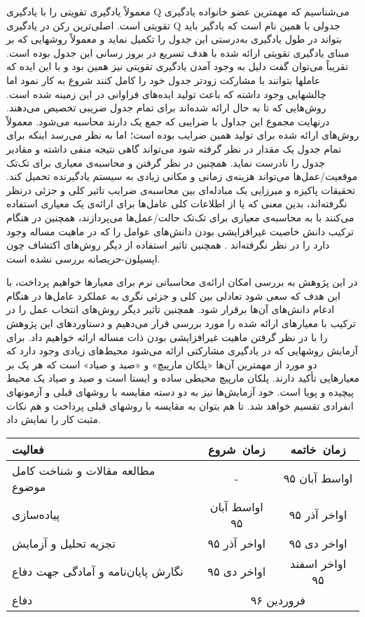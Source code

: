 \documentclass[12pt,a4paper]{article}
\newcommand{\renderref}[1] { \begingroup \let\clearpage\relax  \endgroup }
\begin{document}
معمولاً یادگیری تقویتی را با یادگیری Q می‌شناسیم که مهمترین عضو خانواده یادگیری تقویتی است. اصلی‌ترین رکن در
یادگیری Q جدولی با همین نام است که یادگیر باید بتواند در طول یادگیری به‌درستی این جدول را تکمیل نماید و معمولاً روشهایی
که بر مبنای یادگیری تقویتی ارائه شده با هدف تسریع در بروز رسانی این جدول بوده است. تقریباً می‌توان گفت دلیل به وجود
آمدن یادگیری تقویتی نیز همین بود و با این ایده که عاملها بتوانند با مشارکت زودتر جدول خود را کامل کنند شروع به کار نمود
اما چالشهایی وجود داشته که باعث تولید ایده‌های فراوانی در این زمینه شده است.
روش‌هایی که تا به حال ارائه‌ شده‌اند برای تمام جدول ضریبی تخصیص می‌دهند. درنهایت مجموع این جداول با ضرایبی که
جمع یک دارند محاسبه می‌شود. معمولاً روش‌های ارائه‌ شده برای تولید همین ضرایب بوده است؛ اما به نظر می‌رسد اینکه برای تمام جدول یک
مقدار در نظر گرفته شود می‌تواند گاهی نتیجه منفی داشته و مقادیر جدول را نادرست نماید. همچنین در نظر گرفتن و محاسبه‌ی معیاری برای تک‌تک موقعیت/عمل‌ها می‌تواند هزینه‌ی زمانی و مکانی زیادی به سیستم یادگیرنده تحمیل کند.
تحقیقات پاکیزه و میرزایی  یک مبادله‌ای بین محاسبه‌ی ضرایب تاثیر کلی و جزئی درنظر نگرفته‌اند، بدین معنی که یا از اطلاعات کلی عامل‌ها برای ارائه‌ی یک معیاری استفاده می‌کنند با به محاسبه‌ی معیاری برای تک‌تک حالت/عمل‌ها می‌پردازند، همچنین در هنگام ترکیب دانش خاصیت غیرافزایشی بودن دانش‌های عوامل را که در ماهیت مساله وجود دارد را در نظر نگرفته‌اند . همچنین تاثیر استفاده از دیگر روش‌های اکتشاف چون اپسیلون-حریصانه بررسی نشده است.

در این پژوهش به بررسی امکان ارائه‌ی محاسباتی نرم برای معیار‌ها خواهیم پرداخت، با این هدف که سعی شود تعادلی بین کلی و جزئی نگری به عملکرد عامل‌ها در هنگام ادغام دانش‌های آن‌ها برقرار شود. همچنین تاثیر دیگر روش‌های انتخاب عمل را در ترکیب با معیار‌های ارائه شده را مورد بررسی قرار  می‌دهیم و دستاورد‌های این پژوهش را با در نظر گرفتن ماهیت غیرافزایشی بودن ذات مساله ارائه خواهیم داد.
برای آزمایش روشهایی که در یادگیری مشارکتی ارائه می‌شود محیط‌های زیادی وجود دارد که دو مورد از مهمترین آن‌ها
«پلکان مارپیچ» و «صید و صیاد» است که هر یک بر معیارهایی تأکید دارند. پلکان مارپیچ محیطی ساده و ایستا است و صید و صیاد یک
محیط پیچیده و پویا است. خود آزمایش‌ها نیز به دو دسته مقایسه با روشهای قبلی و آزمونهای انفرادی تقسیم خواهد شد. تا هم
بتوان به مقایسه با روشهای قبلی پرداخت و هم نکات مثبت کار را نمایش داد.
\begin{table}[h!]
\centering
\begin{tabular}{p{8cm}|c|c}
فعالیت & زمان\ شروع & زمان\ خاتمه
\\\hline
 مطالعه مقالات و شناخت کامل موضوع & - & اواسط آبان ۹۵
\\\hline
پیاده‌سازی & اواسط آبان ۹۵ & اواخر آذر ۹۵
\\\hline
تجزیه تحلیل و آزمایش & اواخر آذر ۹۵ & اواخر دی ۹۵
\\\hline
نگارش پایان‌نامه و آمادگی جهت دفاع & اواخر دی ۹۵ & اواخر اسفند ۹۵
\\\hline
دفاع & \multicolumn{2}{c}{فروردین ۹۶}
\end{tabular}
\end{table}
\renderref{reference}
\end{document}
